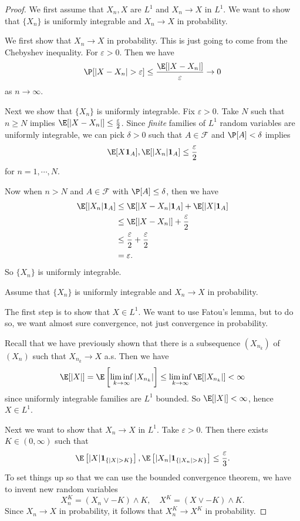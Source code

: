 \documentclass[a4paper]{article}
\begin{document}
\begin{proof}
  We first assume that $X_n, X$ are $L^1$ and $X_n \to X$ in $L^1$. We want to show that $\{X_n\}$ is uniformly integrable and $X_n \to X$ in probability.

  We first show that $X_n \to X$ in probability. This is just going to come from the Chebyshev inequality. For $\varepsilon > 0$. Then we have
  \[
    \P[|X - X_n| > \varepsilon] \leq \frac{\E[|X - X_n|]}{\varepsilon} \to 0
  \]
  as $n \to \infty$.

  Next we show that $\{X_n\}$ is uniformly integrable. Fix $\varepsilon > 0$. Take $N$ such that $n \geq N$ implies $\E[|X - X_n|] \leq \frac{\varepsilon}{2}$. Since \emph{finite} families of $L^1$ random variables are uniformly integrable, we can pick $\delta > 0$ such that $A \in \mathcal{F}$ and $\P[A] < \delta$ implies
  \[
    \E[X \mathbf{1}_A], \E[|X_n|\mathbf{1}_A] \leq \frac{\varepsilon}{2}
  \]
  for $n = 1, \cdots, N$.

  Now when $n > N$ and $A \in \mathcal{F}$ with $\P[A] \leq \delta$, then we have
  \begin{align*}
    \E[|X_n| \mathbf{1}_A] &\leq \E[|X - X_n| \mathbf{1}_A] + \E[|X|\mathbf{1}_A]\\
    &\leq \E[|X - X_n|] + \frac{\varepsilon}{2}\\
    &\leq \frac{\varepsilon}{2} + \frac{\varepsilon}{2}\\
    &= \varepsilon.
  \end{align*}
  So $\{X_n\}$ is uniformly integrable.

  \separator

  Assume that $\{X_n\}$ is uniformly integrable and $X_n \to X$ in probability.

  The first step is to show that $X \in L^1$. We want to use Fatou's lemma, but to do so, we want almost sure convergence, not just convergence in probability.

  Recall that we have previously shown that there is a subsequence $(X_{n_k})$ of $(X_n)$ such that $X_{n_k} \to X$ a.s. Then we have
  \[
    \E[|X|] = \E\left[\liminf_{k \to \infty} |X_{n_k}|\right] \leq \liminf_{k \to \infty} \E[|X_{n_k}|] < \infty
  \]
  since uniformly integrable families are $L^1$ bounded. So $\E[|X|] < \infty$, hence $X \in L^1$.

  Next we want to show that $X_n \to X$ in $L^1$. Take $\varepsilon > 0$. Then there exists $K \in (0, \infty)$ such that
  \[
    \E\left[|X| \mathbf{1}_{\{|X| > K\}}\right], \E\left[|X_n| \mathbf{1}_{\{|X_n| > K\}}\right] \leq \frac{\varepsilon}{3}.
  \]
  To set things up so that we can use the bounded convergence theorem, we have to invent new random variables
  \[
    X_n^K = (X_n \vee -K) \wedge K,\quad X^K = (X \vee -K)\wedge K.
  \]
  Since $X_n \to X$ in probability, it follows that $X_n^K \to X^K$ in probability.


\end{proof}
\end{document}
